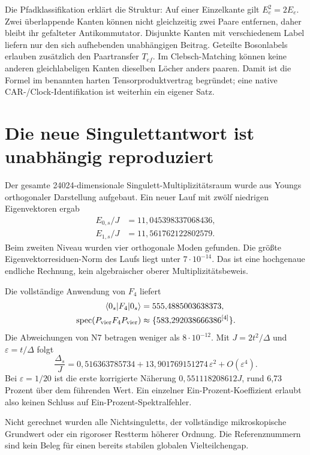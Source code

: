 Die Pfadklassifikation erklärt die Struktur: Auf einer Einzelkante gilt $E_e^2=2E_e$. Zwei überlappende Kanten können nicht gleichzeitig zwei Paare entfernen, daher bleibt ihr gefalteter Antikommutator. Disjunkte Kanten mit verschiedenem Label liefern nur den sich aufhebenden unabhängigen Beitrag. Geteilte Bosonlabels erlauben zusätzlich den Paartransfer $T_{ef}$. Im Clebsch-Matching können keine anderen gleichlabeligen Kanten dieselben Löcher anders paaren. Damit ist die Formel im benannten harten Tensorproduktvertrag begründet; eine native CAR-/Clock-Identifikation ist weiterhin ein eigener Satz.

\section{Die neue Singulettantwort ist unabhängig reproduziert}
Der gesamte 24024-dimensionale Singulett-Multiplizitätsraum wurde aus Youngs orthogonaler Darstellung aufgebaut. Ein neuer Lauf mit zwölf niedrigen Eigenvektoren ergab
\begin{align}
E_{0,s}/J&=11{,}045398337068436,\\
E_{1,s}/J&=11{,}561762122802579.
\end{align}
Beim zweiten Niveau wurden vier orthogonale Moden gefunden. Die größte Eigenvektorresiduen-Norm des Laufs liegt unter $7\cdot10^{-14}$. Das ist eine hochgenaue endliche Rechnung, kein algebraischer oberer Multiplizitätsbeweis.

Die vollständige Anwendung von $F_4$ liefert
\begin{align}
\langle0_s|F_4|0_s\rangle&=555{,}4885003638373,\\
\operatorname{spec}(P_{\mathrm{vier}}F_4P_{\mathrm{vier}})
&\approx\{583{,}292038666386^{[4]}\}.
\end{align}
Die Abweichungen von N7 betragen weniger als $8\cdot10^{-12}$. Mit $J=2t^2/\Delta$ und $\varepsilon=t/\Delta$ folgt
\begin{equation}
\frac{\Delta_s}{J}
=0{,}516363785734
+13{,}901769151274\,\varepsilon^2+O(\varepsilon^4).
\end{equation}
Bei $\varepsilon=1/20$ ist die erste korrigierte Näherung $0{,}551118208612J$, rund 6,73 Prozent über dem führenden Wert. Ein einzelner Ein-Prozent-Koeffizient erlaubt also keinen Schluss auf Ein-Prozent-Spektralfehler.

Nicht gerechnet wurden alle Nichtsinguletts, der vollständige mikroskopische Grundwert oder ein rigoroser Restterm höherer Ordnung. Die Referenznummern sind kein Beleg für einen bereits stabilen globalen Vielteilchengap.

